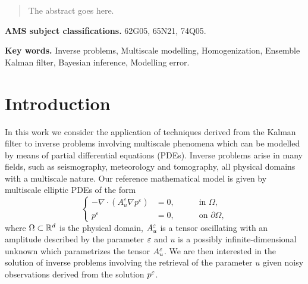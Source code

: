 \documentclass[10pt]{article}
\begin{document}
\maketitle	

\begin{abstract} The abstract goes here.
\end{abstract}	

\textbf{AMS subject classifications.} 62G05, 65N21, 74Q05.

\textbf{Key words.} Inverse problems, Multiscale modelling, Homogenization, Ensemble Kalman filter, Bayesian inference, Modelling error.

\section{Introduction}

In this work we consider the application of techniques derived from the Kalman filter to inverse problems involving multiscale phenomena which can be modelled by means of partial differential equations (PDEs). Inverse problems arise in many fields, such as seismography, meteorology and tomography, all physical domains with a multiscale nature. Our reference mathematical model is given by multiscale elliptic PDEs of the form
\begin{equation}
\left\{
\begin{alignedat}{2}
- \nabla \cdot ( A^{\varepsilon}_u \nabla p^{\varepsilon} ) &= 0, \quad && \text{ in } \Omega, \\
p^{\varepsilon} &= 0, \quad && \text{ on } \partial \Omega,
\end{alignedat}
\right.
\end{equation}
where $\Omega \subset \mathbb{R}^d$ is the physical domain, $A_u^\varepsilon$ is a tensor oscillating with an amplitude described by the parameter $\varepsilon$ and $u$ is a possibly infinite-dimensional unknown which parametrizes the tensor $A^\varepsilon_u$. We are then interested in the solution of inverse problems involving the retrieval of the parameter $u$ given noisy observations derived from the solution $p^\varepsilon$. 
\end{document}
